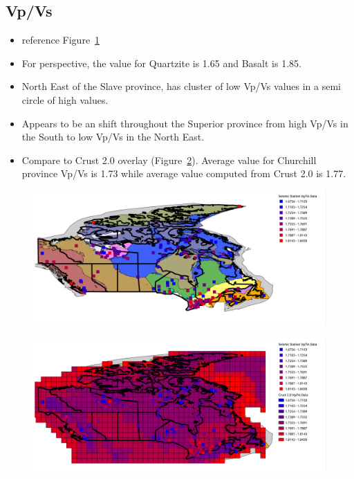 \documentclass[draft, 12pt]{article}
\begin{document}
\subsection{Vp/Vs}
\begin{itemize}
  \item reference Figure~\ref{fig:VpVsMap}
  \item For perspective, the value for Quartzite is 1.65 and Basalt is 1.85.
  \item North East of the Slave province, has cluster of low Vp/Vs values in a semi circle of high values.
  \item Appears to be an shift throughout the Superior province from high Vp/Vs in the South to low Vp/Vs in the North East.
  \item Compare to Crust 2.0 overlay (Figure~\ref{fig:VpVsMapCrust}).  Average value for Churchill province Vp/Vs is 1.73 while average value computed from Crust 2.0 is 1.77.
\end{itemize}

\begin{figure}
  \centering
    \includegraphics[width=\textwidth]{VpVsMap}
  \caption{}
  \label{fig:VpVsMap}
\end{figure}

\begin{figure}
  \centering
    \includegraphics[width=\textwidth]{VpVsMapCrust}
  \caption{}
  \label{fig:VpVsMapCrust}
\end{figure}
\end{document}
